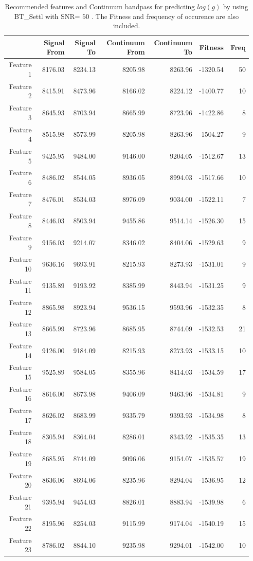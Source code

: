 {{\begin{table}
\begin{center}
\begin{tabular}{rrrrrrr}
  \hline
 & Signal From & Signal To & Continuum From & Continuum To & Fitness & Freq \\ 
  \hline
Feature 1 & 8176.03 & 8234.13 & 8205.98 & 8263.96 & -1320.54 &  50 \\ 
  Feature 2 & 8415.91 & 8473.96 & 8166.02 & 8224.12 & -1400.77 &  10 \\ 
  Feature 3 & 8645.93 & 8703.94 & 8665.99 & 8723.96 & -1422.86 &   8 \\ 
  Feature 4 & 8515.98 & 8573.99 & 8205.98 & 8263.96 & -1504.27 &   9 \\ 
  Feature 5 & 9425.95 & 9484.00 & 9146.00 & 9204.05 & -1512.67 &  13 \\ 
  Feature 6 & 8486.02 & 8544.05 & 8936.05 & 8994.03 & -1517.66 &  10 \\ 
  Feature 7 & 8476.01 & 8534.03 & 8976.09 & 9034.00 & -1522.11 &   7 \\ 
  Feature 8 & 8446.03 & 8503.94 & 9455.86 & 9514.14 & -1526.30 &  15 \\ 
  Feature 9 & 9156.03 & 9214.07 & 8346.02 & 8404.06 & -1529.63 &   9 \\ 
  Feature 10 & 9636.16 & 9693.91 & 8215.93 & 8273.93 & -1531.01 &   9 \\ 
  Feature 11 & 9135.89 & 9193.92 & 8385.99 & 8443.94 & -1531.25 &   9 \\ 
  Feature 12 & 8865.98 & 8923.94 & 9536.15 & 9593.96 & -1532.35 &   8 \\ 
  Feature 13 & 8665.99 & 8723.96 & 8685.95 & 8744.09 & -1532.53 &  21 \\ 
  Feature 14 & 9126.00 & 9184.09 & 8215.93 & 8273.93 & -1533.15 &  10 \\ 
  Feature 15 & 9525.89 & 9584.05 & 8355.96 & 8414.03 & -1534.59 &  17 \\ 
  Feature 16 & 8616.00 & 8673.98 & 9406.09 & 9463.96 & -1534.81 &   9 \\ 
  Feature 17 & 8626.02 & 8683.99 & 9335.79 & 9393.93 & -1534.98 &   8 \\ 
  Feature 18 & 8305.94 & 8364.04 & 8286.01 & 8343.92 & -1535.35 &  13 \\ 
  Feature 19 & 8685.95 & 8744.09 & 9096.06 & 9154.07 & -1535.57 &  19 \\ 
  Feature 20 & 8636.06 & 8694.06 & 8235.96 & 8294.04 & -1536.95 &  12 \\ 
  Feature 21 & 9395.94 & 9454.03 & 8826.01 & 8883.94 & -1539.98 &   6 \\ 
  Feature 22 & 8195.96 & 8254.03 & 9115.99 & 9174.04 & -1540.19 &  15 \\ 
  Feature 23 & 8786.02 & 8844.10 & 9235.98 & 9294.01 & -1542.00 &  10 \\  
   \hline
\end{tabular}
\caption {Recommended features and Continuum bandpass for predicting $log(g)$ 
      by using BT\_Settl with SNR= $ 50 $ . 
      The Fitness and frequency of occurence are also included.} \label{tab:tab_SNR50_G} 
\end{center}
\end{table}

}}
